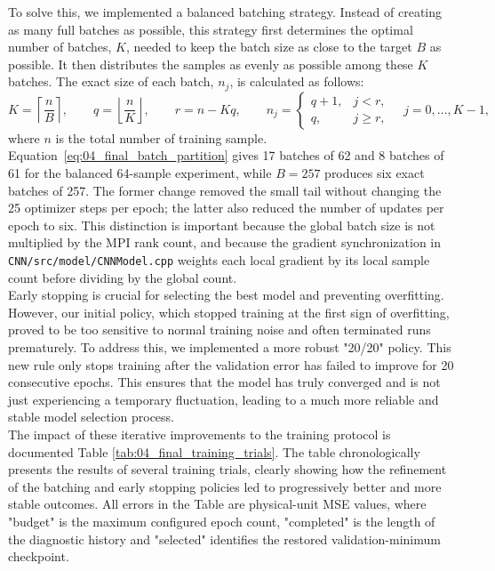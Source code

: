 To solve this, we implemented a balanced batching strategy. Instead of creating as many full batches as possible, this strategy first determines the optimal number of batches, $K$, needed to keep the batch size as close to the target $B$ as possible. It then distributes the samples as evenly as possible among these $K$ batches. The exact size of each batch, $n_j$, is calculated as follows:
\begin{equation}
    K=\left\lceil\frac{n}{B}\right\rceil,
    \qquad q=\left\lfloor\frac{n}{K}\right\rfloor,
    \qquad r=n-Kq,
    \qquad
    n_j=\begin{cases}
        q+1, & j<r,\\
        q, & j\geq r,
    \end{cases}
    \quad j=0,\ldots,K-1,
    \label{eq:04_final_batch_partition}
\end{equation} 
where $n$ is the total number of training sample. Equation~\eqref{eq:04_final_batch_partition} gives 17 batches of 62 and 8 batches of 61 for the balanced 64-sample experiment, while $B=257$ produces six exact batches of 257. The former change removed the small tail without changing the 25 optimizer steps per epoch; the latter also reduced the number of updates per epoch to six. This distinction is important because the global batch size is not multiplied by the MPI rank count, and because the gradient synchronization in \texttt{CNN/src/model/CNNModel.cpp} weights each local gradient by its local sample count before dividing by the global count.\\

Early stopping is crucial for selecting the best model and preventing overfitting. However, our initial policy, which stopped training at the first sign of overfitting, proved to be too sensitive to normal training noise and often terminated runs prematurely. To address this, we implemented a more robust "20/20" policy. This new rule only stops training after the validation error has failed to improve for 20 consecutive epochs. This ensures that the model has truly converged and is not just experiencing a temporary fluctuation, leading to a much more reliable and stable model selection process.\\

The impact of these iterative improvements to the training protocol is documented Table \ref{tab:04_final_training_trials}. The table chronologically presents the results of several training trials, clearly showing how the refinement of the batching and early stopping policies led to progressively better and more stable outcomes. All errors in the Table are physical-unit MSE values, where "budget" is the maximum configured epoch count, "completed" is the length of the diagnostic history and "selected" identifies the restored validation-minimum checkpoint.\\

